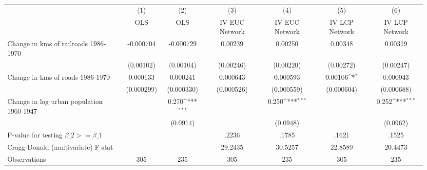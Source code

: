 {
\def\sym#1{\ifmmode^{#1}\else\(^{#1}\)\fi}
\begin{tabular}{l*{6}{c}}
\hline\hline
                &\multicolumn{1}{c}{(1)}&\multicolumn{1}{c}{(2)}&\multicolumn{1}{c}{(3)}&\multicolumn{1}{c}{(4)}&\multicolumn{1}{c}{(5)}&\multicolumn{1}{c}{(6)}\\
                &\multicolumn{1}{c}{OLS}&\multicolumn{1}{c}{OLS}&\multicolumn{1}{c}{IV EUC Network}&\multicolumn{1}{c}{IV EUC Network}&\multicolumn{1}{c}{IV LCP Network}&\multicolumn{1}{c}{IV LCP Network}\\
\hline
Change in kms of railroads 1986-1970&-0.000704         &-0.000729         &  0.00239         &  0.00250         &  0.00348         &  0.00319         \\
                &(0.00102)         &(0.00104)         &(0.00246)         &(0.00220)         &(0.00272)         &(0.00247)         \\
[1em]
Change in kms of roads 1986-1970& 0.000133         & 0.000241         & 0.000643         & 0.000593         &  0.00106\sym{*}  & 0.000943         \\
                &(0.000299)         &(0.000330)         &(0.000526)         &(0.000559)         &(0.000604)         &(0.000688)         \\
[1em]
Change in log urban population 1960-1947&                  &    0.270\sym{***}&                  &    0.250\sym{***}&                  &    0.252\sym{***}\\
                &                  & (0.0914)         &                  & (0.0948)         &                  & (0.0962)         \\
\hline
P-value for testing $\beta\_{2} >= \beta\_{1}$&                  &                  &    .2236         &    .1785         &    .1621         &    .1525         \\
Cragg-Donald (multivariate) F-stat&                  &                  &  29.2435         &  30.5257         &  22.8589         &  20.4473         \\
Observations    &      305         &      235         &      305         &      235         &      305         &      235         \\
\hline\hline
\end{tabular}
}
